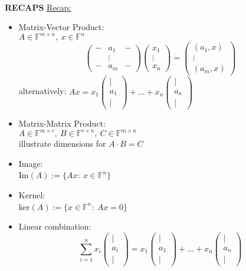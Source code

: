 

\begin{frame}
	~\\
	{\blank \textbf{RECAPS}
		\underline{Recap:}\\
		\begin{itemize}\blank
			\item Matrix-Vector Product:\\
			$A\in\mathbb{F}^{m\times n},~x\in\mathbb{F}^n$
			$$
			\begin{pmatrix}
			-&a_1&-\\~&\vdots&~\\-&a_m&-
			\end{pmatrix}
			\begin{pmatrix}
			x_1\\\vdots\\x_n
			\end{pmatrix}
			=\begin{pmatrix}
			(a_1,x)\\\vdots\\(a_m,x)
			\end{pmatrix}
			$$
			alternatively: $ Ax= x_1\begin{pmatrix}|\\a_1\\|\end{pmatrix}+\dots+x_n\begin{pmatrix}|\\a_n\\|\end{pmatrix} $
			\item Matrix-Matrix Product:\\
			$A\in\mathbb{F}^{m\times r},~B\in\mathbb{F}^{r\times n},~C\in\mathbb{F}^{m\times n}$\\
			illustrate dimensions for $A\cdot B=C$
			\item Image:\\
			Im$(A) :=\{Ax:~x\in\mathbb{F}^n\}$
			\item Kernel:\\
			ker$(A) := \{x\in\mathbb{F}^n:~Ax=0\}$
			\item Linear combination:
			$$
			\sum_{i=1}^{n} x_i\begin{pmatrix}|\\a_i\\|\end{pmatrix}
			=x_1\begin{pmatrix}|\\a_1\\|\end{pmatrix}+\dots+x_n\begin{pmatrix}|\\a_n\\|\end{pmatrix}
			$$
		\end{itemize}
	}
\end{frame}
